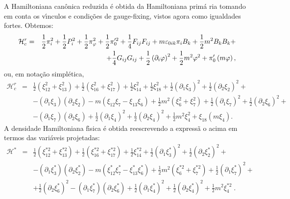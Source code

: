 \documentclass[a4paper,thmsa,12pt]{report}
\begin{document}
A Hamiltoniana can\^{o}nica reduzida \'{e} obtida da Hamiltoniana prim\'{a}%
ria tomando em conta os v\'{\i}nculos e condi\c{c}\~{o}es de gauge-fixing,
vistos agora como igualdades fortes. Obtemos: 
\begin{eqnarray}
\mathcal{H}_{c}^{r} &=&\frac{1}{2}\pi _{i}^{2}+\frac{1}{2}P_{i}^{2}+\frac{1}{%
2}\pi _{\varphi }^{2}+\frac{1}{2}\pi _{0}^{\prime 2}+\frac{1}{4}%
F_{ij}F_{ij}+m\varepsilon _{0ik}\pi _{i}B_{k}+\frac{1}{2}m^{2}B_{k}B_{k}+ 
\nonumber \\
&&+\frac{1}{4}G_{ij}G_{ij}+\frac{1}{2}\left( \partial _{i}\varphi \right)
^{2}+\frac{1}{2}m^{2}\varphi ^{2}+\pi _{0}^{\prime }\left( m\varphi \right) ,
\label{361}
\end{eqnarray}
ou, em nota\c{c}\~{a}o simpl\'{e}tica, 
\begin{eqnarray}
\mathcal{H}_{c}^{r} &=&\frac{1}{2}\left( \xi _{12}^{2}+\xi _{13}^{2}\right) +%
\frac{1}{2}\left( \xi _{16}^{2}+\xi _{17}^{2}\right) +\frac{1}{2}\xi
_{14}^{2}+\frac{1}{2}\xi _{18}^{2}+\frac{1}{2}\left( \partial _{1}\xi
_{3}\right) ^{2}+\frac{1}{2}\left( \partial _{2}\xi _{2}\right) ^{2}+ 
\nonumber \\
&&-\left( \partial _{1}\xi _{3}\right) \left( \partial _{2}\xi _{2}\right)
-m\left( \xi _{12}\xi _{7}-\xi _{13}\xi _{6}\right) +\frac{1}{2}m^{2}\left(
\xi _{6}^{2}+\xi _{7}^{2}\right) +\frac{1}{2}\left( \partial _{1}\xi
_{7}\right) ^{2}+\frac{1}{2}\left( \partial _{2}\xi _{6}\right) ^{2}+ 
\nonumber \\
&&-\left( \partial _{1}\xi _{7}\right) \left( \partial _{2}\xi _{6}\right) +%
\frac{1}{2}\left( \partial _{1}\xi _{4}\right) ^{2}+\frac{1}{2}\left(
\partial _{2}\xi _{4}\right) ^{2}+\frac{1}{2}m^{2}\xi _{4}^{2}+\xi
_{18}\left( m\xi _{4}\right) .  \label{362}
\end{eqnarray}
A densidade Hamiltoniana f\'{\i}sica \'{e} obtida reescrevendo a express\~{a}%
o acima em termos das vari\'{a}veis projetadas: 
\begin{eqnarray}
\mathcal{H}^{\ast } &=&\frac{1}{2}\left( \xi _{12}^{\ast 2}+\xi _{13}^{\ast
2}\right) +\frac{1}{2}\left( \xi _{16}^{\ast 2}+\xi _{17}^{\ast 2}\right) +%
\frac{1}{2}\xi _{14}^{\ast 2}+\frac{1}{2}\left( \partial _{1}\xi _{3}^{\ast
}\right) ^{2}+\frac{1}{2}\left( \partial _{2}\xi _{2}^{\ast }\right) ^{2}+ 
\nonumber \\
&&-\left( \partial _{1}\xi _{3}^{\ast }\right) \left( \partial _{2}\xi
_{2}^{\ast }\right) -m\left( \xi _{12}^{\ast }\xi _{7}^{\ast }-\xi
_{13}^{\ast }\xi _{6}^{\ast }\right) +\frac{1}{2}m^{2}\left( \xi _{6}^{\ast
2}+\xi _{7}^{\ast 2}\right) +\frac{1}{2}\left( \partial _{1}\xi _{7}^{\ast
}\right) ^{2}+  \nonumber \\
&&+\frac{1}{2}\left( \partial _{2}\xi _{6}^{\ast }\right) ^{2}-\left(
\partial _{1}\xi _{7}^{\ast }\right) \left( \partial _{2}\xi _{6}^{\ast
}\right) +\frac{1}{2}\left( \partial _{1}\xi _{4}^{\ast }\right) ^{2}+\frac{1%
}{2}\left( \partial _{2}\xi _{4}^{\ast }\right) ^{2}+\frac{1}{2}m^{2}\xi
_{4}^{\ast 2}\;.  \label{363}
\end{eqnarray}
\end{document}
